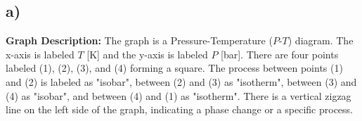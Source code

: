 

\subsection*{a)}

\textbf{Graph Description:} The graph is a Pressure-Temperature ($P$-$T$) diagram. The x-axis is labeled $T$ [K] and the y-axis is labeled $P$ [bar]. There are four points labeled (1), (2), (3), and (4) forming a square. The process between points (1) and (2) is labeled as "isobar", between (2) and (3) as "isotherm", between (3) and (4) as "isobar", and between (4) and (1) as "isotherm". There is a vertical zigzag line on the left side of the graph, indicating a phase change or a specific process.